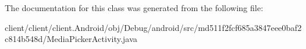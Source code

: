 The documentation for this class was generated from the following file\+:\begin{DoxyCompactItemize}
\item 
client/client/client.\+Android/obj/\+Debug/android/src/md511f2fcf685a3847eee0baf2c814b548d/Media\+Picker\+Activity.\+java\end{DoxyCompactItemize}
